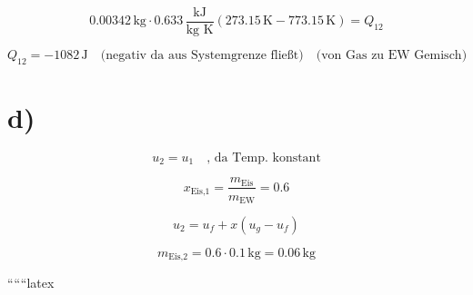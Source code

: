 \[
0.00342 \, \text{kg} \cdot 0.633 \, \frac{\text{kJ}}{\text{kg K}} (273.15 \, \text{K} - 773.15 \, \text{K}) = Q_{12}
\]

\[
Q_{12} = -1082 \, \text{J} \quad \text{(negativ da aus Systemgrenze fließt)} \quad \text{(von Gas zu EW Gemisch)}
\]

\section*{d)}

\[
u_2 = u_1 \quad \text{, da Temp. konstant}
\]

\[
x_{\text{Eis,1}} = \frac{m_{\text{Eis}}}{m_{\text{EW}}} = 0.6
\]

\[
u_2 = u_f + x (u_g - u_f)
\]

\[
m_{\text{Eis,2}} = 0.6 \cdot 0.1 \, \text{kg} = 0.06 \, \text{kg}
\]

``````latex


